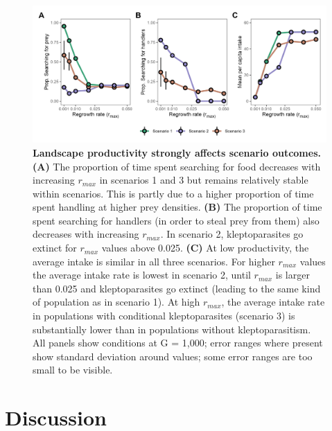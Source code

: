 \begin{refsection}[sorting=nyt]
\begin{figure}[t!]
    \centering
    \includegraphics[width=\textwidth]{figures/kleptomove/fig_06.png}
    \caption{
        \textbf{Landscape productivity strongly affects scenario outcomes.}
        \textbf{(A)} The proportion of time spent searching for food decreases with increasing $r_{max}$ in scenarios 1 and 3 but remains relatively stable within scenarios. 
        This is partly due to a higher proportion of time spent handling at higher prey densities. 
        \textbf{(B)} The proportion of time spent searching for handlers (in order to steal prey from them) also decreases with increasing $r_{max}$. 
        In scenario 2, kleptoparasites go extinct for $r_{max}$ values above 0.025. 
        \textbf{(C)} At low productivity, the average intake is similar in all three scenarios. 
        For higher $r_{max}$ values the average intake rate is lowest in scenario 2, until $r_{max}$ is larger than 0.025 and kleptoparasites go extinct (leading to the same kind of population as in scenario 1). 
        At high $r_{max}$, the average intake rate in populations with conditional kleptoparasites (scenario 3) is substantially lower than in populations without kleptoparasitism.
        All panels show conditions at G = 1,000; error ranges where present show standard deviation around values; some error ranges are too small to be visible.
    }
    \label{fig6}
\end{figure}

\section*{Discussion}


\end{refsection}
